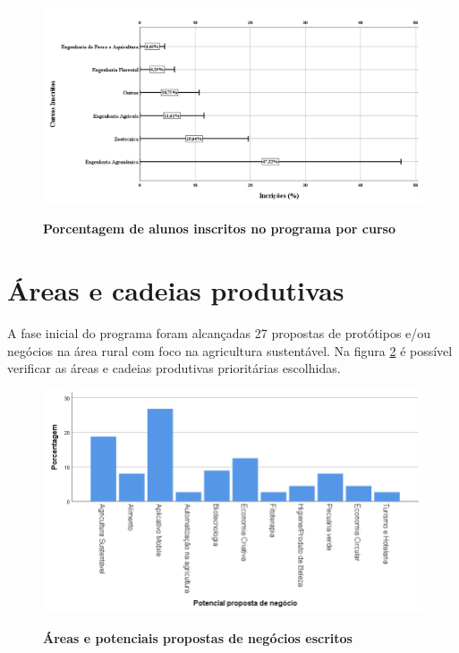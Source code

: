 \begin{figure}[!htb]
\caption{\textbf{Porcentagem de alunos inscritos no programa por curso}}
\centering
\includegraphics[scale=0.3]{Imagens/inscritos.png}
\label{figura_10}
\end{figure}



\section{Áreas e cadeias produtivas}

A fase inicial do programa foram alcançadas 27 propostas de protótipos e/ou negócios na área rural com foco na agricultura sustentável. Na figura \ref{figura_11} é possível verificar as áreas e cadeias produtivas prioritárias escolhidas.

\begin{figure}[!htb]
\centering
\caption{\textbf{Áreas e potenciais propostas de negócios escritos}}
\includegraphics[scale=0.3]{Imagens/propostas_negocios.png}
\label{figura_11}
\end{figure}
\newpage

